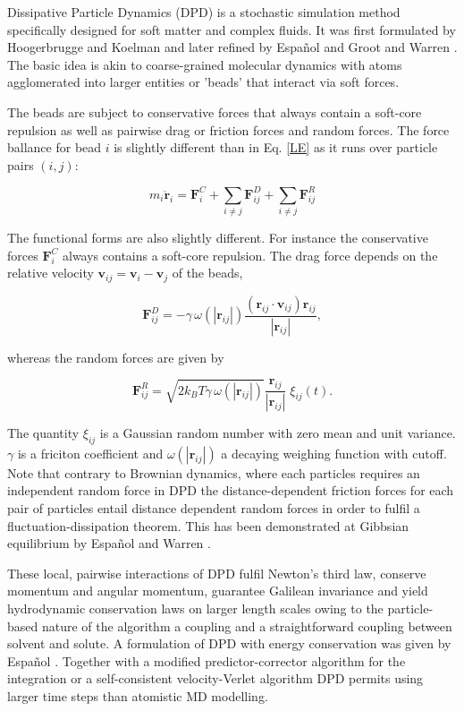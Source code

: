 \documentclass[8.5pt,twoside,twocolumn]{article}
\newcommand{\beq}{\begin{equation}}
\newcommand{\eeq}{\end{equation}}
\begin{document}
Dissipative Particle Dynamics (DPD) is a stochastic simulation method specifically designed for soft matter
and complex fluids. It was first formulated by Hoogerbrugge and Koelman 
\cite{Hoogerbrugge:1992, Koelman:1993} and later refined by Espa\~nol \cite{Espanol:1995b} and 
Groot and Warren \cite{Groot:1997}.
The basic idea is akin to coarse-grained molecular dynamics with atoms agglomerated into larger
entities or 'beads' that interact via soft forces. 

The beads are subject to conservative forces that always contain a soft-core repulsion as well as pairwise drag
or friction forces and random forces. The force ballance for bead $i$ is slightly different than in Eq. \ref{LE} as it 
runs over particle pairs $(i,j)$:

\beq
m_i \ddot{{\mathbf{r}}}_i=\mathbf{F}_i^C+\sum_{i\neq j}\mathbf{F}_{i j}^D + \sum_{i\neq j}\mathbf{F}_{i j}^R
\eeq

The functional forms are also slightly different. For instance the conservative forces $\mathbf{F}_i^C$ always contains a soft-core repulsion. 
The drag force depends on the relative velocity $\mathbf{v}_{ij} = \mathbf{v}_i - \mathbf{v}_j$ of the beads,

\beq
\mathbf{F}_{ij}^D=-\gamma\,\omega(|\mathbf{r}_{ij}|)\frac{(\mathbf{r}_{ij}\cdot\mathbf{v}_{ij})\mathbf{r}_{ij}}{|\mathbf{r}_{ij}|},
\eeq

whereas the random forces are given by

\beq
\mathbf{F}_{ij}^R=\sqrt{2 k_B T \gamma\, \omega(|\mathbf{r}_{ij}|)} \frac{\mathbf{r}_{ij}}{|\mathbf{r}_{ij}|}\;\xi_{ij}(t).
\eeq

The quantity $\xi_{i j}$ is a Gaussian random number with zero mean and unit variance. $\gamma$ is a friciton coefficient and
$\omega(|\mathbf{r}_{ij}|)$ a decaying weighing function with cutoff. 
Note that contrary to Brownian dynamics, where each particles requires an independent random force in DPD the 
distance-dependent friction forces for each pair of particles entail distance dependent random forces 
in order to fulfil a fluctuation-dissipation theorem.
This has been demonstrated at Gibbsian equilibrium by Espa\~nol and Warren \cite{Espanol:1995a}.

These local, pairwise interactions of DPD fulfil Newton's third law, conserve momentum and angular momentum, 
guarantee Galilean invariance and yield hydrodynamic conservation laws on larger length scales owing to the 
particle-based nature of the algorithm a coupling and a straightforward coupling between solvent and solute.
A formulation of DPD with energy conservation was given by Espa\~nol \cite{Espanol:1997}.
Together with a modified predictor-corrector algorithm for the integration \cite{Groot:1997} or a self-consistent 
 velocity-Verlet algorithm \cite{Pagonabarraga:2001} DPD permits using larger time steps than atomistic MD 
modelling.
\end{document}
